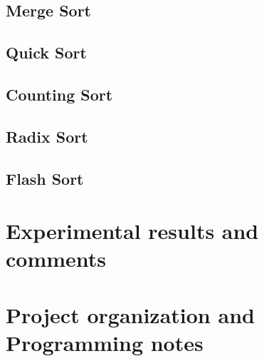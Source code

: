 \documentclass[11pt,a4paper]{article}
\begin{document}
{		\subsection{Merge Sort}
		\subsection{Quick Sort}
		\subsection{Counting Sort}
		\subsection{Radix Sort}
		\subsection{Flash Sort}
	\section{Experimental results and comments}
	\section{Project organization and Programming notes}
	
	
	
	
	
	
}
\end{document}
